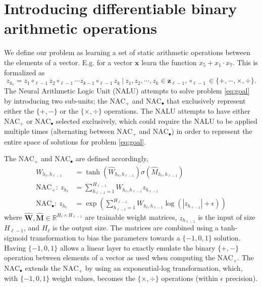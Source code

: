 \section{Introducing differentiable binary arithmetic operations}
\label{sec:Nalu}
We define our problem as learning a set of static arithmetic operations between the elements of a vector. E.g. for a vector $\mathbf{x}$ learn the function ${x_5 + x_1 \cdot x_7}$.
This is formalized as
\begin{equation}
z_{h_\ell} = z_1 \circ_{\ell-1} z_{2} \circ_{\ell-1} \cdots z_{k-1} \circ_{\ell-1} z_{{k}}\ |\ z_1, z_2, \cdots, z_k \in \mathbf{z}_{\ell-1}, \circ_{\ell-1} \in \{+, -, \times, \div \}.
\label{eq:goal}
\end{equation}
The Neural Arithmetic Logic Unit (NALU) \cite{trask-nalu} attempts to solve problem \ref{eq:goal} by introducing two sub-units; the $\text{NAC}_{+}$ and $\text{NAC}_{\bullet}$ that exclusively represent either the $\{+, -\}$ or the $\{\times, \div \}$ operations.
The NALU attempts to have either $\text{NAC}_{+}$ or $\text{NAC}_{\bullet}$ selected exclusively, which could require the NALU to be applied multiple times (alternating between $\text{NAC}_{+}$ and $\text{NAC}_{\bullet}$) in order to represent the entire space of solutions for problem \ref{eq:goal}.

The $\text{NAC}_{+}$ and $\text{NAC}_{\bullet}$ are defined accordingly,
\begin{align}
W_{h_\ell, h_{\ell-1}} &= \tanh(\hat{W}_{h_\ell, h_{\ell-1}}) \sigma(\hat{M}_{h_\ell, h_{\ell-1}}) \label{eq:weight}\\
\textrm{NAC}_+:\ z_{h_\ell} &= \sum_{h_{\ell-1}=1}^{H_{\ell-1}} W_{h_{\ell}, h_{\ell-1}} z_{h_{\ell-1}} \label{eq:naca}\\
\textrm{NAC}_\bullet:\ z_{h_\ell} &= \exp\left(\sum_{h_{\ell-1}=1}^{H_{\ell-1}} W_{h_{\ell}, h_{\ell-1}} \label{eq:nacm}\log(|z_{h_{\ell-1}}| + \epsilon) \right)
\end{align}
where $\hat{\mathbf{W}}, \hat{\mathbf{M}} \in \mathbb{R}^{H_{\ell} \times H_{\ell-1}}$ are trainable weight matrices, $z_{h_{\ell-1}}$ is the input of size $H_{\ell-1}$, and $H_{\ell}$ is the output size. The matrices are combined using a tanh-sigmoid transformation to bias the parameters towards a $\{-1,0,1\}$ solution. Having $\{-1,0,1\}$ allows a linear layer to exactly emulate the binary $\{+, -\}$ operation between elements of a vector as used when computing the $\text{NAC}_{+}$.
The $\text{NAC}_{\bullet}$ extends the $\text{NAC}_{+}$ by using an exponential-log transformation, which, with $\{-1,0,1\}$ weight values, becomes the $\{\times, \div \}$ operations (within $\epsilon$ precision).

